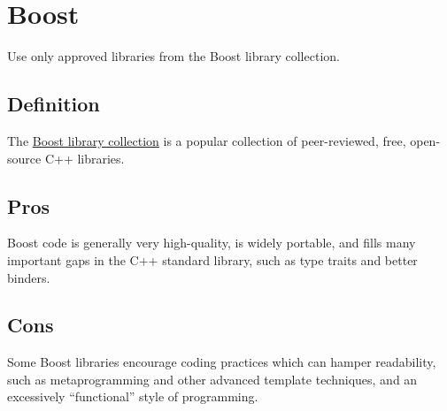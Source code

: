 
\section{Boost}\label{sec:boost}
Use only approved libraries from the Boost library collection.

\subsection{Definition}
The \href{https://www.boost.org/}{Boost library collection} is a popular collection of peer-reviewed, free, open-source C++ libraries.

\subsection{Pros}
Boost code is generally very high-quality, is widely portable, and fills many important gaps in the C++ standard library, such as type traits and better binders.

\subsection{Cons}
Some Boost libraries encourage coding practices which can hamper readability, such as metaprogramming and other advanced template techniques, and an excessively \enquote{functional} style of programming.

